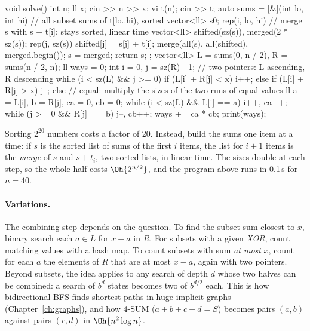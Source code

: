 \begin{code}
void solve() {
    int n;
    ll x;
    cin >> n >> x;
    vi t(n);
    cin >> t;
    auto sums = [&](int lo, int hi) {  // all subset sums of t[lo..hi), sorted
        vector<ll> s{0};
        rep(i, lo, hi) {  // merge s with s + t[i]: stays sorted, linear time
            vector<ll> shifted(sz(s)), merged(2 * sz(s));
            rep(j, sz(s)) shifted[j] = s[j] + t[i];
            merge(all(s), all(shifted), merged.begin());
            s = merged;
        }
        return s;
    };
    vector<ll> L = sums(0, n / 2), R = sums(n / 2, n);
    ll ways = 0;
    int i = 0, j = sz(R) - 1;  // two pointers: L ascending, R descending
    while (i < sz(L) && j >= 0) {
        if (L[i] + R[j] < x) i++;
        else if (L[i] + R[j] > x) j--;
        else {  // equal: multiply the sizes of the two runs of equal values
            ll a = L[i], b = R[j], ca = 0, cb = 0;
            while (i < sz(L) && L[i] == a) i++, ca++;
            while (j >= 0 && R[j] == b) j--, cb++;
            ways += ca * cb;
        }
    }
    print(ways);
}
\end{code}

\begin{trick}
Sorting $2^{20}$ numbers costs a factor of 20. Instead, build the sums one item at a time: if $s$ is the sorted list of sums
of the first $i$ items, the list for $i + 1$ items is the \emph{merge} of $s$ and $s + t_i$, two sorted lists, in linear
time. The sizes double at each step, so the whole half costs $\Oh{2^{n/2}}$, and the program above runs in 0.1\,s for
$n = 40$.
\end{trick}


\paragraph{Variations.} The combining step depends on the question. To find the subset sum closest to $x$, binary search
each $a \in L$ for $x - a$ in $R$. For subsets with a given \emph{XOR}, count matching values with a hash map. To count
subsets with sum \emph{at most} $x$, count for each $a$ the elements of $R$ that are at most $x - a$, again with two
pointers. Beyond subsets, the idea applies to any search of depth $d$ whose two halves can be combined: a search of $b^d$
states becomes two of $b^{d/2}$ each. This is how bidirectional BFS finds shortest paths in huge implicit graphs
(Chapter~\ref{ch:graphs}), and how 4-SUM ($a + b + c + d = S$) becomes pairs $(a, b)$ against pairs $(c, d)$ in
$\Oh{n^2 \log n}$.

